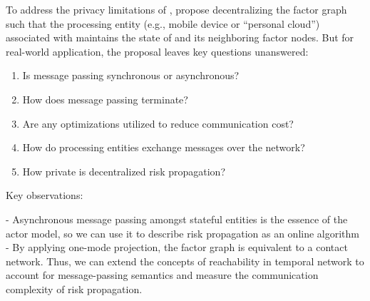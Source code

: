 To address the privacy limitations of \cRiskPropagation{}, \citet{Ayday2021} propose decentralizing the factor graph such that the processing entity (e.g., mobile device or ``personal cloud'') associated with  maintains the state of  and its neighboring factor nodes. But for real-world application, the proposal leaves key questions unanswered:
%
\begin{enumerate}
  \item Is message passing synchronous or asynchronous?
  \item How does message passing terminate?
  \item Are any optimizations utilized to reduce communication cost?
  \item How do processing entities exchange messages over the network?
  \item How private is decentralized risk propagation?
\end{enumerate}
%
Key observations:

- Asynchronous message passing amongst stateful entities is the essence of the actor model, so we can use it to describe risk propagation as an online algorithm
- By applying one-mode projection, the factor graph is equivalent to a contact network. Thus, we can extend the concepts of reachability in temporal network to account for message-passing semantics and measure the communication complexity of risk propagation.

